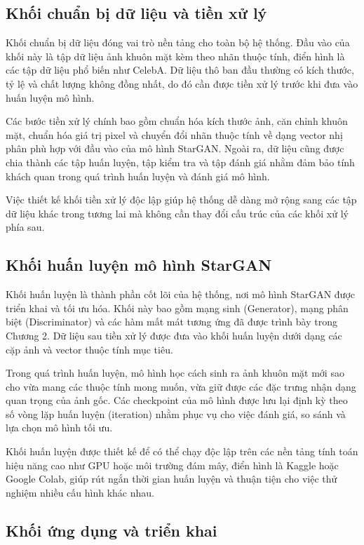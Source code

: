 \documentclass[../DoAn.tex]{subfiles}
\begin{document}
\subsection{Khối chuẩn bị dữ liệu và tiền xử lý}

Khối chuẩn bị dữ liệu đóng vai trò nền tảng cho toàn bộ hệ thống. Đầu vào của khối này là tập dữ liệu ảnh khuôn mặt kèm theo nhãn thuộc tính, điển hình là các tập dữ liệu phổ biến như CelebA. Dữ liệu thô ban đầu thường có kích thước, tỷ lệ và chất lượng không đồng nhất, do đó cần được tiền xử lý trước khi đưa vào huấn luyện mô hình.

Các bước tiền xử lý chính bao gồm chuẩn hóa kích thước ảnh, căn chỉnh khuôn mặt, chuẩn hóa giá trị pixel và chuyển đổi nhãn thuộc tính về dạng vector nhị phân phù hợp với đầu vào của mô hình StarGAN. Ngoài ra, dữ liệu cũng được chia thành các tập huấn luyện, tập kiểm tra và tập đánh giá nhằm đảm bảo tính khách quan trong quá trình huấn luyện và đánh giá mô hình.

Việc thiết kế khối tiền xử lý độc lập giúp hệ thống dễ dàng mở rộng sang các tập dữ liệu khác trong tương lai mà không cần thay đổi cấu trúc của các khối xử lý phía sau.


\subsection{Khối huấn luyện mô hình StarGAN}

Khối huấn luyện là thành phần cốt lõi của hệ thống, nơi mô hình StarGAN được triển khai và tối ưu hóa. Khối này bao gồm mạng sinh (Generator), mạng phân biệt (Discriminator) và các hàm mất mát tương ứng đã được trình bày trong Chương 2. Dữ liệu sau tiền xử lý được đưa vào khối huấn luyện dưới dạng các cặp ảnh và vector thuộc tính mục tiêu.

Trong quá trình huấn luyện, mô hình học cách sinh ra ảnh khuôn mặt mới sao cho vừa mang các thuộc tính mong muốn, vừa giữ được các đặc trưng nhận dạng quan trọng của ảnh gốc. Các checkpoint của mô hình được lưu lại định kỳ theo số vòng lặp huấn luyện (iteration) nhằm phục vụ cho việc đánh giá, so sánh và lựa chọn mô hình tối ưu.

Khối huấn luyện được thiết kế để có thể chạy độc lập trên các nền tảng tính toán hiệu năng cao như GPU hoặc môi trường đám mây, điển hình là Kaggle hoặc Google Colab, giúp rút ngắn thời gian huấn luyện và thuận tiện cho việc thử nghiệm nhiều cấu hình khác nhau.


\subsection{Khối ứng dụng và triển khai}
\end{document}
